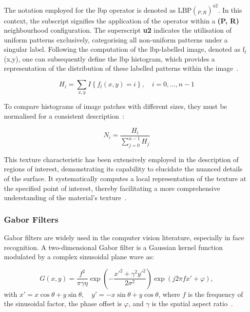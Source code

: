 The notation employed for the \ac{lbp} operator is denoted as $\text{LBP}(_{P, R})^{u2}$.
In this context, the subscript signifies the application of the operator within a \textbf{(P, R)} neighbourhood configuration. The superscript \textbf{u2} indicates the utilisation of uniform patterns exclusively, categorising all non-uniform patterns under a singular label.
Following the computation of the \ac{lbp}-labelled image, denoted as f$_{l}$(x,y), one can subsequently define the \ac{lbp} histogram, which provides a representation of the distribution of these labelled patterns within the image~\cite{pietikainen_local_2010}.


\begin{equation} 
H_i = \sum_{x,y} I\left\{ f_l(x,y) = i \right\}, \quad i = 0, \ldots, n-1
\end{equation}

To compare histograms of image patches with different sizes, they must be normalised for a consistent description~\cite{pietikainen_local_2010}:

\begin{equation}
N_i = \frac{H_i}{\sum_{j=0}^{n-1} H_j}
\end{equation}

This texture characteristic has been extensively employed in the description of regions of interest, demonstrating its capability to elucidate the nuanced details of the surface. It systematically computes a local representation of the texture at the specified point of interest, thereby facilitating a more comprehensive understanding of the material's texture~\cite{kaur_review_2021}.


\subsubsection{Gabor Filters}

Gabor filters are widely used in the computer vision literature, especially in face recognition. A two-dimensional Gabor filter is a Gaussian kernel function modulated by a complex sinusoidal plane wave as:

\begin{equation}
G(x, y) = \frac{f^2}{\pi \gamma \eta} \exp\left( -\frac{x'^2 + \gamma^2 y'^2}{2\sigma^2} \right) \exp\left( j 2 \pi f x' + \varphi \right),
\end{equation}
with $x' = x \cos\theta + y \sin\theta, \quad y' = -x \sin\theta + y \cos\theta$,
where $f$ is the frequency of the sinusoidal factor, the phase offset is $\varphi$,  and  $\gamma$ is the spatial aspect ratio~\cite{farag_feature_2017}.

